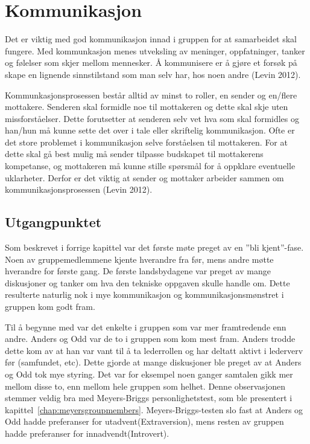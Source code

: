 \section{Kommunikasjon}
Det er viktig med god kommunikasjon innad i gruppen for at samarbeidet skal fungere. 
Med kommunkasjon menes utveksling av meninger, oppfatninger, tanker og følelser som skjer mellom mennesker.
Å kommunisere er å gjøre et forsøk på skape en lignende sinnstilstand som man selv har, hos noen andre (Levin 2012).
\vspace{\secspace}

Kommunkasjonsprosessen består alltid av minst to roller, en sender og en/flere mottakere. 
Senderen skal formidle noe til mottakeren og dette skal skje uten missforståelser. 
Dette forutsetter at senderen selv vet hva som skal formidles og han/hun må kunne sette det over i tale eller skriftelig kommunikasjon. 
Ofte er det store problemet i kommunikasjon selve forståelsen til mottakeren. 
For at dette skal gå best mulig må sender tilpasse budskapet til mottakerens kompetanse, og mottakeren må kunne stille spørsmål for å oppklare eventuelle uklarheter. 
Derfor er det viktig at sender og mottaker arbeider sammen om kommunikasjonsprosessen (Levin 2012).

\subsection{Utgangpunktet}
Som beskrevet i forrige kapittel var det første møte preget av en ''bli kjent''-fase. 
Noen av gruppemedlemmene kjente hverandre fra før, mens andre møtte hverandre for første gang. 
De første landsbydagene var preget av mange diskusjoner og tanker om hva den tekniske oppgaven skulle handle om. 
Dette resulterte naturlig nok i mye kommunikasjon og kommunikasjonsmønstret i gruppen kom godt fram. 
\vspace{\secspace}

Til å begynne med var det enkelte i gruppen som var mer framtredende enn andre. 
Anders og Odd var de to i gruppen som kom mest fram. 
Anders trodde dette kom av at han var vant til å ta lederrollen og har deltatt aktivt i lederverv før (samfundet, etc).
Dette gjorde at mange diskusjoner ble preget av at Anders og Odd tok mye styring. 
Det var for eksempel noen ganger samtalen gikk mer mellom disse to, enn mellom hele gruppen som helhet. 
Denne observasjonen stemmer veldig bra med Meyers-Briggs personlighetstest, som ble presentert i kapittel~\ref{chap:meyersgroupmembers}.
Meyers-Briggs-testen slo fast at Anders og Odd hadde preferanser for utadvent(Extraversion), mens resten av gruppen hadde preferanser for innadvendt(Introvert). 
\vspace{\secspace}

